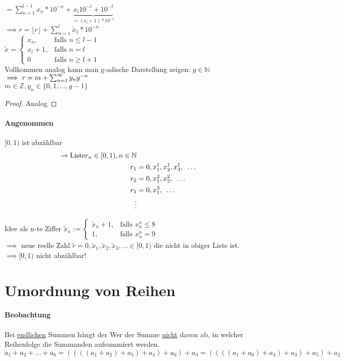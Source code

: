 $=\sum_{n=1}^{l-1} x_n * 10^{-n} + \underbrace{x_l 10^{-l} + 10^{-l}}_{=(x_l + 1) * 10^{-l}}$\\
$\implies r = \lfloor r \rfloor + \sum_{n=1}^l \tilde{x}_1 * 10^{-n}$\\
$\tilde{x} = \left\{\begin{array}{cl} x_n, & \mbox{falls } n\leq l -1\\ x_l + 1, & \mbox{falls } n = l\\ 0 & \mbox{falls } n\geq l + 1 \end{array}\right. $\\
Vollkommen analog kann man g-adische Darstellung zeigen: $g \in\mathbb{N}$\\
$\implies r = m + \sum_{n=1}^{\infty}	y_n g^{-n}$\\
$m\in\mathbb{Z}, y_n \in\{ 0,1,\ldots ,g-1\}$\\
\begin{proof}
Analog
\end{proof}

\paragraph{Angenommen} $[0,1)$ ist abzählbar
\begin{equation}
\begin{split}
  \rightarrow \text{Liste} r_n \in [0,1), n\in \mathbb{N} \\
  r_1 &= 0, x_1^1, x_2^1, x_3^1, \text{ }\ldots \\
  r_2 &= 0, x_1^2, x_2^2, \text{ }\ldots \\
  r_3 &= 0, x_1^3, \text{ }\ldots \\
  \vdots
\end{split}
\end{equation}


Idee als n-te Ziffer $\tilde{x}_n := \left\{\begin{array}{cl} \tilde{x}_n + 1, & \mbox{falls } x_n^n \leq 8\\ 1, & \mbox{falls } x_n^n = 9 \end{array}\right. $\\
$\implies$ neue reelle Zahl $\tilde{r} = 0, \tilde{x}_1, \tilde{x}_2, \tilde{x}_3, \ldots \in [0,1)$ die nicht in obiger Liste ist.
$\implies [0,1)$ nicht abzählbar!

\section{Umordnung von Reihen}
\paragraph{Beobachtung} Bei \underline{endlichen} Summen hängt der Wer der Summe \underline{nicht} davon ab, in welcher Reihenfolge die Summanden aufsummiert werden.\\
$a_1 + a_2 + \ldots + a_6 = ((((a_1+a_2)+a_5)+a_4)+a_6)+a_3 = ((((a_1+a_6)+a_4)+a_3)+a_5)+a_2$

